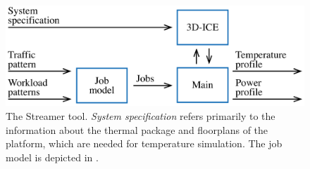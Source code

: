 \begin{figure}
  \centering
  \includegraphics[width=1.0\columnwidth]{include/assets/figures/streamer.pdf}

  \caption{The Streamer tool. \emph{System specification} refers primarily to
  the information about the thermal package and floorplans of the platform,
  which are needed for temperature simulation. The job model is depicted in
  .}

\end{figure}
